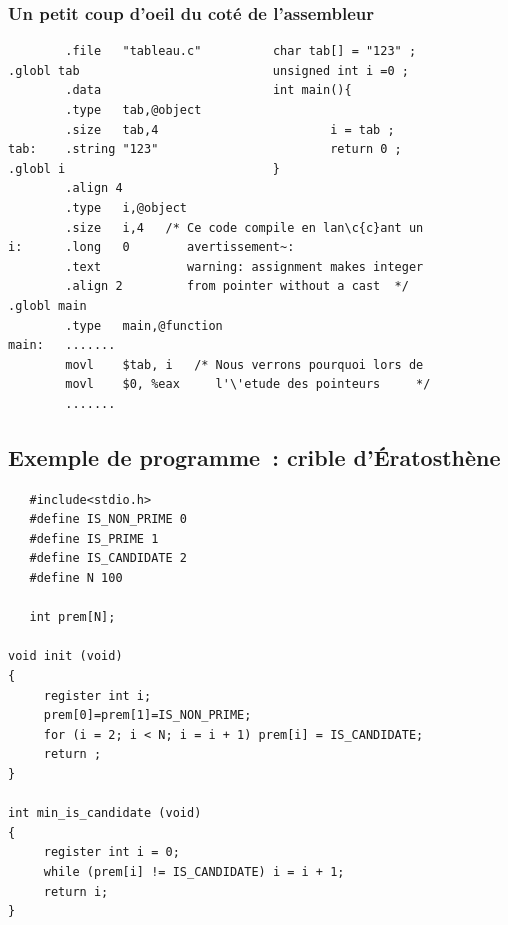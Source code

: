 \begin{frame}[fragile]
  \frametitle{Un petit coup d'oeil du cot\'e de l'assembleur}%
\begin{verbatim}
        .file   "tableau.c"          char tab[] = "123" ;
.globl tab                           unsigned int i =0 ; 
        .data                        int main(){            
        .type   tab,@object                         
        .size   tab,4                        i = tab ;   
tab:    .string "123"                        return 0 ;  
.globl i                             }                   
        .align 4
        .type   i,@object
        .size   i,4   /* Ce code compile en lan\c{c}ant un
i:      .long   0        avertissement~:
        .text            warning: assignment makes integer 
        .align 2         from pointer without a cast  */
.globl main                    
        .type   main,@function 
main:   ....... 
        movl    $tab, i   /* Nous verrons pourquoi lors de 
        movl    $0, %eax     l'\'etude des pointeurs     */
        .......
\end{verbatim}
\end{frame}
%
\begin{frame}[fragile]
\section{Exemple de programme~: crible d'\'Eratosth\`ene}
\begin{verbatim}
   #include<stdio.h>
   #define IS_NON_PRIME 0
   #define IS_PRIME 1
   #define IS_CANDIDATE 2
   #define N 100

   int prem[N];

void init (void) 
{
     register int i;
     prem[0]=prem[1]=IS_NON_PRIME;
     for (i = 2; i < N; i = i + 1) prem[i] = IS_CANDIDATE;
     return ;
}

int min_is_candidate (void) 
{
     register int i = 0;
     while (prem[i] != IS_CANDIDATE) i = i + 1;
     return i;
}
\end{verbatim}
\end{frame}
